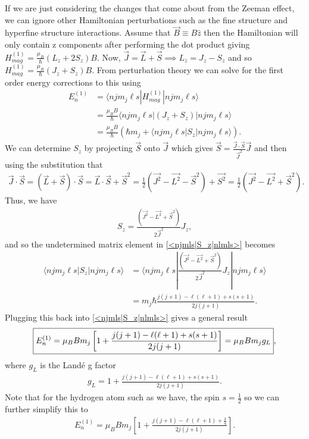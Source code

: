 If we are just considering the changes that come about from the Zeeman effect, we can ignore other Hamiltonian perturbations such as the fine structure and hyperfine structure interactions. Assume that $\vec{B} \equiv B\hat{z}$ then the Hamiltonian will only contain z components after performing the dot product giving $H_{mag}^{(1)} = \frac{\mu_B}{\hbar}(L_z+2S_z)B$. Now, $\vec{J}=\vec{L}+\vec{S} \implies L_z = J_z-S_z$ and so
$H_{mag}^{(1)} = \frac{\mu_B}{\hbar}(J_z+S_z)B$. From perturbation theory we can solve for the first order energy corrections to this using
\begin{align}
	E_{n}^{(1)} &= \langle n j m_j \ell s| H_{mag}^{(1)}|n j m_j \ell s \rangle \nonumber\\
	&= \frac{\mu_BB}{\hbar}\langle n j m_j \ell s| (J_z+S_z)|n j m_j \ell s \rangle \nonumber\\
	&= \frac{\mu_BB}{\hbar}\left(\hbar m_j+\langle n j m_j \ell s| S_z|n j m_j \ell s \rangle \right). \label{<njmls|S_z|nlmls>}
\end{align}
We can determine $S_z$ by projecting $\vec{S}$ onto $\vec{J}$ which gives $\vec{S} = \frac{\vec{J}\cdot\vec{S}}{\vec{J}^2}\vec{J}$ and then using the substitution that 
\begin{align}
	\vec{J}\cdot \vec{S} = (\vec{L}+\vec{S})\cdot \vec{S} = \vec{L}\cdot\vec{S}+\vec{S}^2 = \frac{1}{2}(\vec{J^2}-\vec{L^2}-\vec{S}^2)+\vec{S^2} = \frac{1}{2}(\vec{J^2}-\vec{L^2}+\vec{S}^2).
\end{align}
Thus, we have
\begin{align}
	S_z = \frac{(\vec{J^2}-\vec{L^2}+\vec{S}^2)}{2\vec{J}^2}J_z,
\end{align}
and so the undetermined matrix element in \ref{<njmls|S_z|nlmls>} becomes 
\begin{align}
	\langle n j m_j \ell s| S_z|n j m_j \ell s \rangle &= \langle n j m_j \ell s| \frac{(\vec{J^2}-\vec{L^2}+\vec{S}^2)}{2\vec{J}^2}J_z|n j m_j \ell s \rangle \nonumber \\
	&= m_j \hbar \frac{j(j+1)-\ell(\ell+1)+s(s+1)}{2j(j+1)}.
\end{align}
Plugging this back into \ref{<njmls|S_z|nlmls>} gives a general result
\begin{align}
	\boxed{E_{n}^{(1)} = \mu_BBm_j\left[1+\frac{j(j+1)-\ell(\ell+1)+s(s+1)}{2j(j+1)}\right] = \mu_BBm_jg_L}, \label{E_{n}^{(1)}}
\end{align}
where $g_L$ is the Land\'{e} g factor
\begin{align}
	g_L = 1+\frac{j(j+1)-\ell(\ell+1)+s(s+1)}{2j(j+1)}. \label{lande_g_factor}
\end{align}
Note that for the hydrogen atom such as we have, the spin $s=\frac{1}{2}$ so we can further simplify this to 
\begin{align}
	E_{n}^{(1)} = \mu_BBm_j\left[1+\frac{j(j+1)-\ell(\ell+1)+\frac{3}{4} }{2j(j+1)} \right].
\end{align}



